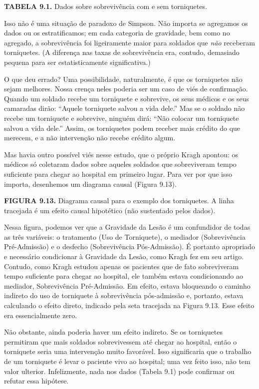\documentclass[11pt,a5paper,twoside]{book}
\begin{document}
\textbf{TABELA 9.1.} Dados sobre sobrevivência com e sem torniquetes.

Isso não é uma situação de paradoxo de Simpson. Não importa se agregamos os dados ou os estratificamos; em cada categoria de gravidade, bem como no agregado, a sobrevivência foi ligeiramente maior para soldados que \textit{não} receberam torniquetes. (A diferença nas taxas de sobrevivência era, contudo, demasiado pequena para ser estatisticamente significativa.)

O que deu errado? Uma possibilidade, naturalmente, é que os torniquetes não sejam melhores. Nossa crença neles poderia ser um caso de viés de confirmação. Quando um soldado recebe um torniquete e sobrevive, os seus médicos e os seus camaradas dirão: “Aquele torniquete salvou a vida dele.” Mas se o soldado não recebe um torniquete e sobrevive, ninguém dirá: “Não colocar um torniquete salvou a vida dele.” Assim, os torniquetes podem receber mais crédito do que merecem, e a não intervenção não recebe crédito algum.

Mas havia outro possível viés nesse estudo, que o próprio Kragh apontou: os médicos só coletaram dados sobre aqueles soldados que sobreviveram tempo suficiente para chegar ao hospital em primeiro lugar. Para ver por que isso importa, desenhemos um diagrama causal (Figura 9.13).

\textbf{FIGURA 9.13.} Diagrama causal para o exemplo dos torniquetes. A linha tracejada é um efeito causal hipotético (não sustentado pelos dados).

Nessa figura, podemos ver que a Gravidade da Lesão é um confundidor de todas as três variáveis: o tratamento (Uso de Torniquete), o mediador (Sobrevivência Pré-Admissão) e o desfecho (Sobrevivência Pós-Admissão). É portanto apropriado e necessário condicionar à Gravidade da Lesão, como Kragh fez em seu artigo. Contudo, como Kragh estudou apenas os pacientes que de fato sobreviveram tempo suficiente para chegar ao hospital, ele também estava condicionando ao mediador, Sobrevivência Pré-Admissão. Em efeito, estava bloqueando o caminho indireto do uso de torniquete à sobrevivência pós-admissão e, portanto, estava calculando o efeito direto, indicado pela seta tracejada na Figura 9.13. Esse efeito era essencialmente zero.

Não obstante, ainda poderia haver um efeito indireto. Se os torniquetes permitiram que mais soldados sobrevivessem até chegar ao hospital, então o torniquete seria uma intervenção muito favorável. Isso significaria que o trabalho de um torniquete é levar o paciente vivo ao hospital; uma vez feito isso, não tem valor ulterior. Infelizmente, nada nos dados (Tabela 9.1) pode confirmar ou refutar essa hipótese.
\end{document}
